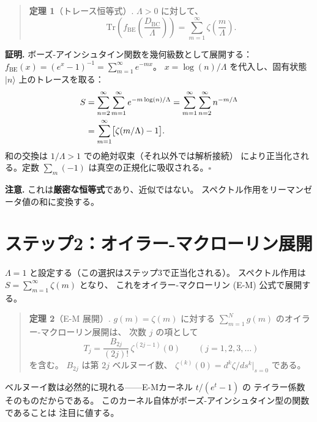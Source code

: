 \documentclass[11pt,a4paper]{article}
\newcommand{\Tr}{\mathrm{Tr}}
\begin{document}
\begin{quote}
\textbf{定理 1}（トレース恒等式）.
$\Lambda>0$ に対して、
\begin{equation}\label{eq:trace}
  \Tr\!\left(f_{\mathrm{BE}}\!\left(\frac{D_{\mathrm{BC}}}{\Lambda}\right)\right)
  = \sum_{m=1}^{\infty}\zeta\!\left(\frac{m}{\Lambda}\right).
\end{equation}
\end{quote}

\textbf{証明.}\quad
ボーズ-アインシュタイン関数を幾何級数として展開する：
$f_{\mathrm{BE}}(x)=(e^x-1)^{-1}=\sum_{m=1}^{\infty}e^{-mx}$。
$x=\log(n)/\Lambda$ を代入し、固有状態 $|n\rangle$ 上のトレースを取る：
\begin{align}
  S &= \sum_{n=2}^{\infty}\sum_{m=1}^{\infty}e^{-m\log(n)/\Lambda}
  = \sum_{m=1}^{\infty}\sum_{n=2}^{\infty}n^{-m/\Lambda}\notag\\
  &= \sum_{m=1}^{\infty}\bigl[\zeta(m/\Lambda)-1\bigr].
\end{align}
和の交換は $1/\Lambda>1$ での絶対収束（それ以外では解析接続）
により正当化される。定数 $\sum_m(-1)$ は真空の正規化に吸収される。$\square$

\medskip

\textbf{注意.} これは\textbf{厳密な恒等式}であり、近似ではない。
スペクトル作用をリーマンゼータ値の和に変換する。

\section{ステップ2：オイラー-マクローリン展開}

$\Lambda=1$ と設定する（この選択はステップ3で正当化される）。
スペクトル作用は $S=\sum_{m=1}^{\infty}\zeta(m)$ となり、
これをオイラー-マクローリン (E-M) 公式で展開する。

\begin{quote}
\textbf{定理 2}（E-M 展開）.
$g(m)=\zeta(m)$ に対する $\sum_{m=1}^{N}g(m)$ のオイラー-マクローリン展開は、
次数 $j$ の項として
\begin{equation}\label{eq:EMterm}
  T_j = \frac{B_{2j}}{(2j)!}\,\zeta^{(2j-1)}(0)
  \qquad (j=1,2,3,\ldots)
\end{equation}
を含む。
$B_{2j}$ は第 $2j$ ベルヌーイ数、
$\zeta^{(k)}(0)=d^k\zeta/ds^k|_{s=0}$ である。
\end{quote}

ベルヌーイ数は必然的に現れる——E-Mカーネル $t/(e^t-1)$ の
テイラー係数そのものだからである。
このカーネル自体がボーズ-アインシュタイン型の関数であることは
注目に値する。
\end{document}
